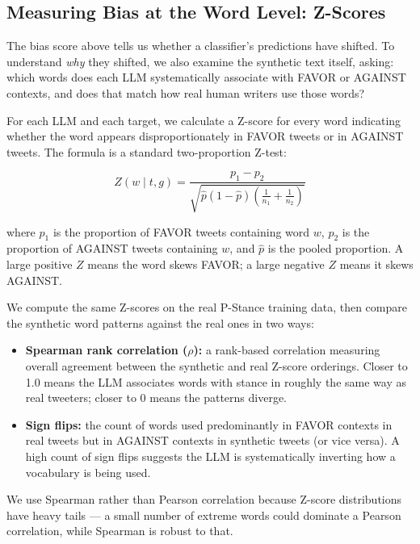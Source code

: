 \documentclass[11pt]{article}
\begin{document}
\subsection{Measuring Bias at the Word Level: Z-Scores}

The bias score above tells us whether a classifier's predictions have shifted. To understand \emph{why} they shifted, we also examine the synthetic text itself, asking: which words does each LLM systematically associate with FAVOR or AGAINST contexts, and does that match how real human writers use those words?

For each LLM and each target, we calculate a Z-score for every word indicating whether the word appears disproportionately in FAVOR tweets or in AGAINST tweets. The formula is a standard two-proportion Z-test:

\begin{equation}
Z(w \mid t, g) = \frac{p_1 - p_2}{\sqrt{\hat{p}(1-\hat{p})(\tfrac{1}{n_1} + \tfrac{1}{n_2})}}
\end{equation}

\noindent where $p_1$ is the proportion of FAVOR tweets containing word $w$, $p_2$ is the proportion of AGAINST tweets containing $w$, and $\hat{p}$ is the pooled proportion. A large positive $Z$ means the word skews FAVOR; a large negative $Z$ means it skews AGAINST.

We compute the same Z-scores on the real P-Stance training data, then compare the synthetic word patterns against the real ones in two ways:

\begin{itemize}
    \item \textbf{Spearman rank correlation ($\rho$):} a rank-based correlation measuring overall agreement between the synthetic and real Z-score orderings. Closer to 1.0 means the LLM associates words with stance in roughly the same way as real tweeters; closer to 0 means the patterns diverge.
    \item \textbf{Sign flips:} the count of words used predominantly in FAVOR contexts in real tweets but in AGAINST contexts in synthetic tweets (or vice versa). A high count of sign flips suggests the LLM is systematically inverting how a vocabulary is being used.
\end{itemize}

We use Spearman rather than Pearson correlation because Z-score distributions have heavy tails --- a small number of extreme words could dominate a Pearson correlation, while Spearman is robust to that.
\end{document}
